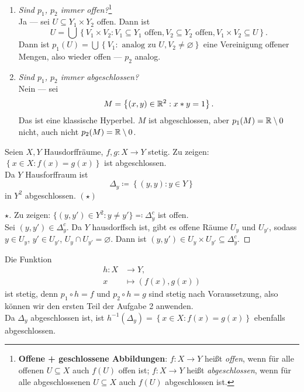 \begin{problem*}[2]
\begin{enumerate}
    \item \emph{Sind $ p_1 $, $ p_2 $ immer offen?}\footnote{\textbf{Offene + geschlossene Abbildungen}: $ f: X \to Y $ heißt \emph{offen}, wenn für alle offenen $ U \subseteq X $ auch $ f(U) $ offen ist; $ f: X \to Y $ heißt \emph{abgeschlossen}, wenn für alle abgeschlossenen $ U \subseteq X $ auch $ f(U) $ abgeschlossen ist.} \\
      Ja --- sei $ U \subseteq Y_1 \times Y_2 $ offen. Dann ist
      \begin{equation*}
        U = \bigcup\left\{ V_1 \times V_2 : V_1 \subseteq Y_1 \text{ offen}, V_2 \subseteq Y_2 \text{ offen}, V_1 \times V_2 \subseteq U \right\}\text{.}
      \end{equation*}
      Dann ist $ p_1(U) = \bigcup\left\{ V_1 : \text{ analog zu } U, V_2 \neq \varnothing \right\} $ eine Vereinigung offener Mengen, also wieder offen --- $ p_2 $ analog.

    \item \emph{Sind $ p_1 $, $ p_2 $ immer abgeschlossen?} \\
      Nein --- sei
      \begin{equation*}
        M = \left\{ (x,y) \in \mathbb{R}^2 : x*y = 1 \right\}\text{.}
      \end{equation*}
      Das ist eine klassische Hyperbel. $ M $ ist abgeschlossen, aber $ p_1(M) = \mathbb{R} \setminus { 0 } $ nicht, auch nicht $ p_2(M) = \mathbb{R} \setminus { 0 } $.
  \end{enumerate}
\end{problem*}

\begin{problem*}[3]
  Seien $ X, Y $ Hausdorffräume, $ f,g : X \to Y $ stetig. Zu zeigen: $ \left\{ x \in X : f(x) = g(x) \right\} $ ist abgeschlossen. \\
  Da $ Y $ Hausforffraum ist
  \begin{equation*}
    \Delta_y \coloneqq \left\{ (y,y) : y \in Y \right\}
  \end{equation*}
  in $ Y^2 $ abgeschlossen. $ (\star) $
  \begin{proof}[$ \star $]
    Zu zeigen: $ \{ (y, y') \in Y^2 : y \neq y' \} \eqqcolon \Delta_y^c $ ist offen. \\
    Sei $ (y,y') \in \Delta_y^c $. Da $ Y $ hausdorffsch ist, gibt es offene Räume $ U_y $ und $ U_{y'} $, sodass $ y \in U_y $, $ y' \in U_{y'} $, $ U_y \cap U_{y'} = \varnothing $. Dann ist $ (y, y') \in U_y \times U_{y'} \subseteq \Delta_y^c $.
  \end{proof}
  Die Funktion
  \begin{align*}
    h : X &\to Y\text{,} \\
    x &\mapsto (f(x), g(x))
  \end{align*}
  ist stetig, denn $ p_1 \circ h = f $ und $ p_2 \circ h = g $ sind stetig nach Voraussetzung, also können wir den ersten Teil der Aufgabe 2 anwenden. \\
  Da $ \Delta_y $ abgeschlossen ist, ist $ h^{-1}(\Delta_y) = \left\{ x \in X : f(x) = g(x) \right\} $ ebenfalls abgeschlossen.
\end{problem*}

